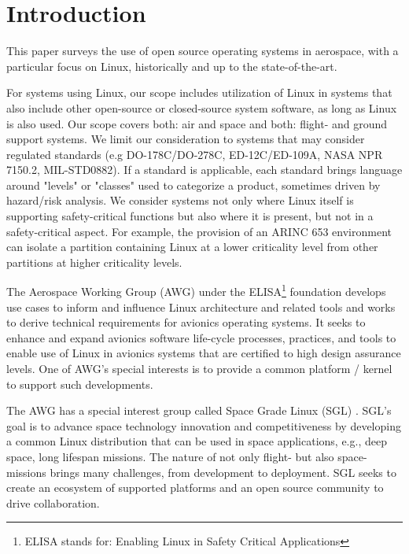 \section{Introduction}
\label{introduction}

This paper surveys the use of open source operating systems in aerospace, with a particular focus on Linux, historically and up to the state-of-the-art. 

For systems using Linux, our scope includes utilization of Linux in systems that also include other open-source or closed-source system software, as long as Linux is also used. Our scope covers both: air and space and both: flight- and ground support systems. We limit our consideration to systems that may consider regulated standards (e.g DO-178C/DO-278C, ED-12C/ED-109A, NASA NPR 7150.2, MIL-STD0882). If a standard is applicable, each standard brings language around "levels" or "classes" used to categorize a product, sometimes driven by hazard/risk analysis. We consider systems not only where Linux itself is supporting safety-critical functions but also where it is present, but not in a safety-critical aspect. For example, the provision of an ARINC 653 environment can isolate a partition containing Linux at a lower criticality level from other partitions at higher criticality levels.

The Aerospace Working Group (AWG) \cite{elisaaero2025} under the ELISA\footnote{ELISA stands for: Enabling Linux in Safety Critical Applications} foundation \cite{elisa2025} develops use cases to inform and influence Linux architecture and related tools and works to derive technical requirements for avionics operating systems. It seeks to enhance and expand avionics software life-cycle processes, practices, and tools to enable use of Linux in avionics systems that are certified to high design assurance levels. One of AWG's special interests is to provide a common platform / kernel to support such developments.

The AWG has a special interest group called Space Grade Linux (SGL) \cite{sgl2025}. SGL's goal is to advance space technology innovation and competitiveness by developing a common Linux distribution that can be used in space applications, e.g., deep space, long lifespan missions. The nature of not only flight- but also space-missions brings many challenges, from development to deployment. SGL seeks to create an ecosystem of supported platforms and an open source community to drive collaboration.

